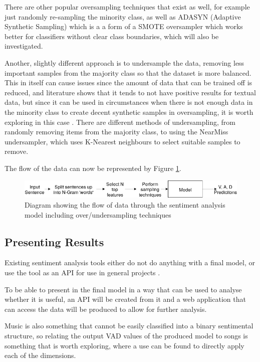 There are other popular oversampling techniques that exist as well, for example just randomly re-sampling the minority class, as well as ADASYN (Adaptive Synthetic Sampling) which is a a form of a SMOTE oversampler which works better for classifiers without clear class boundaries, which will also be investigated.

Another, slightly different approach is to undersample the data, removing less important samples from the majority class so that the dataset is more balanced. This in itself can cause issues since the amount of data that can be trained off is reduced, and literature shows that it tends to not have positive results for textual data, but since it can be used in circumstances when there is not enough data in the minority class to create decent synthetic samples in oversampling, it is worth exploring in this case \cite{more2016survey}. There are different methods of undersampling, from randomly removing items from the majority class, to using the NearMiss undersampler, which uses K-Nearest neighbours to select suitable samples to remove. 

The flow of the data can now be represented by Figure \ref{model:finalFlow}.

\begin{figure}[h]
\centering
\includegraphics[scale=0.5]{litImgs/finalmodelflow.png}
\caption{Diagram showing the flow of data through the sentiment analysis model including over/undersampling techniques}
\label{model:finalFlow}
\end{figure}

\subsection{Presenting Results}

Existing sentiment analysis tools either do not do anything with a final model, or use the tool as an API for use in general projects \cite{sentimentAPI}.  

To be able to present in the final model in a way that can be used to analyse whether it is useful, an API will be created from it and a web application that can access the data will be produced to allow for further analysis.

Music is also something  that cannot be easily classified into a binary sentimental structure, so relating the output VAD values of the produced model to songs is something that is worth exploring, where a use can be found to directly apply each of the dimensions.

